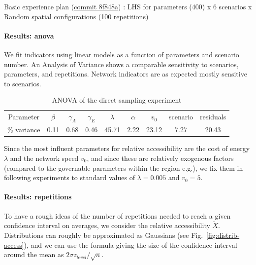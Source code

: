 Basic experience plan (\href{https://github.com/JusteRaimbault/Governance/commit/8f848a20abca8c51b927e18c1aaf1ad3434af2cb}{commit 8f848a}) :
LHS for parameters (400) x 6 scenarios x Random spatial configurations (100 repetitions)


\paragraph{Results: anova}

We fit indicators using linear models as a function of parameters and scenario number. An Analysis of Variance shows a comparable sensitivity to scenarios, parameters, and repetitions. Network indicators are as expected mostly sensitive to scenarios.


\begin{table}
\caption{ANOVA of the direct sampling experiment}
\begin{center}
\begin{tabular}{|c|c|c|c|c|c|c|c|c|}
\hline
Parameter & $\beta$ & $\gamma_A$ & $\gamma_E$ & $\lambda$ & $\alpha$ & $v_0$ & scenario & residuals \\
\% variance & 0.11 & 0.68 & 0.46 & 45.71 & 2.22 & 23.12 & 7.27 & 20.43 \\
\hline
\end{tabular}
\end{center}
\end{table}

Since the most influent parameters for relative accessibility are the cost of energy $\lambda$ and the network speed $v_0$, and since these are relatively exogenous factors (compared to the governable parameters within the region e.g.), we fix them in following experiments to standard values of $\lambda = 0.005$ and $v_0 = 5$.


\paragraph{Results: repetitions}

To have a rough ideas of the number of repetitions needed to reach a given confidence interval on averages, we consider the relative accessibility $\tilde{X}$. Distributions can roughly be approximated as Gaussians (see Fig.~\ref{fig:distrib-access}), and we can use the formula giving the size of the confidence interval around the mean as $2\sigma z_{level} / \sqrt{n}$.

